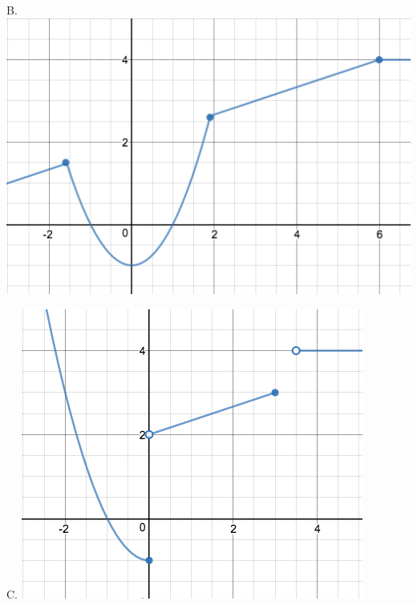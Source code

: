 \documentclass{ximera}
\begin{document}
\begin{question}
\begin{center}
\begin{expandable}
\begin{expandable}
\begin{multicols}{2}
\begin{center}
B. \includegraphics[scale=0.18]{PWGraph6}
\end{center}
\end{multicols}

\begin{multicols}{2}
\begin{center}
C. \includegraphics[scale=0.18]{PWGraph2}
\end{center}


\end{multicols}
\end{expandable}
\end{expandable}
\end{center}
\end{question}
\end{document}
